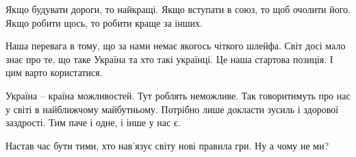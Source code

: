 Якщо будувати дороги, то найкращі. Якщо вступати в союз, то щоб очолити його.
Якщо робити щось, то робити краще за інших. 

Наша перевага в тому, що за нами немає якогось чіткого шлейфа. Світ досі мало
знає про те, що таке Україна та хто такі українці. Це наша стартова позиція. І
цим варто користатися.

Україна – країна можливостей. Тут роблять неможливе. Так говоритимуть про нас у
світі в найближчому майбутньому. Потрібно лише докласти зусиль і здорової
заздрості. Тим паче і одне, і інше у нас є.

Настав час бути тими, хто нав’язує світу нові правила гри. Ну а чому не ми? 
